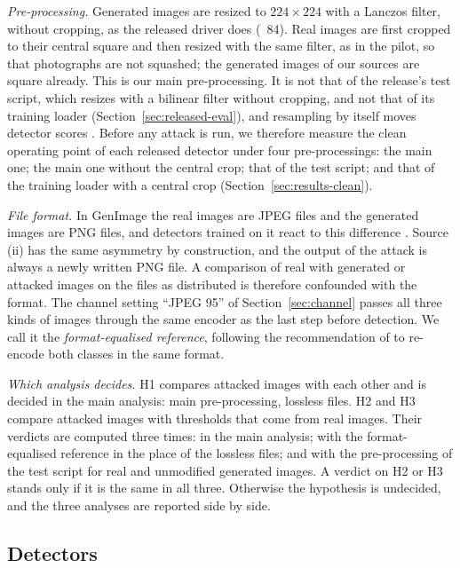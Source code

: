\emph{Pre-processing.} Generated images are resized to $224\times224$ with a Lanczos filter,
without cropping, as the released driver does (~84). Real images are first cropped to
their central square and then resized with the same filter, as in the pilot, so that photographs
are not squashed; the generated images of our sources are square already. This is our main
pre-processing. It is not that of the release's test script, which resizes with a bilinear filter
without cropping, and not that of its training loader (Section~\ref{sec:released-eval}), and
resampling by itself moves detector scores
. Before any attack is run, we therefore
measure the clean operating point of each released detector under four pre-processings: the main
one; the main one without the central crop; that of the test script; and that of the training
loader with a central crop (Section~\ref{sec:results-clean}).

\emph{File format.} In GenImage the real images are JPEG files and the generated images are PNG
files, and detectors trained on it react to this difference . Source
(ii) has the same asymmetry by construction, and the output of the attack is always a newly written
PNG file. A comparison of real with generated or attacked images on the files as distributed is
therefore confounded with the format. The channel setting ``JPEG 95'' of
Section~\ref{sec:channel} passes all three kinds of images through the same encoder as the last
step before detection. We call it the \emph{format-equalised reference}, following the
recommendation of  to re-encode both classes in the same
format.

\emph{Which analysis decides.} H1 compares attacked images with each other and is decided in the
main analysis: main pre-processing, lossless files. H2 and H3 compare attacked images with
thresholds that come from real images. Their verdicts are computed three times: in the main
analysis; with the format-equalised reference in the place of the lossless files; and with the
pre-processing of the test script for real and unmodified generated images. A verdict on H2 or H3
stands only if it is the same in all three. Otherwise the hypothesis is undecided, and the three
analyses are reported side by side.

\subsection{Detectors}
\label{sec:detectors}

